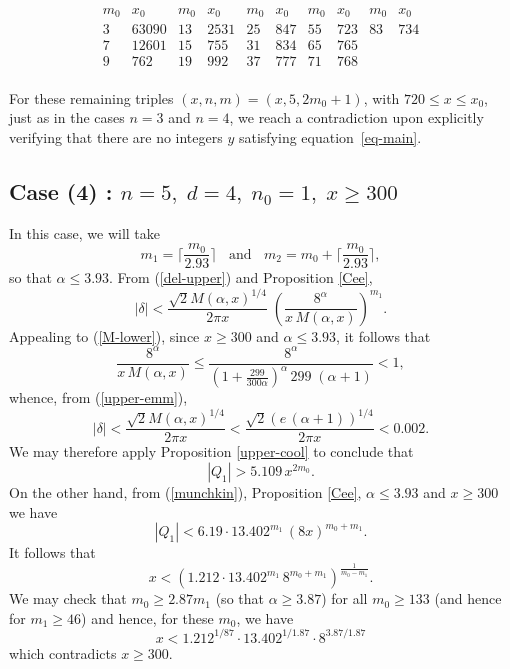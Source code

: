 {$$
\begin{array}{cc|cc|cc|cc|cc} 
m_0 & x_0 & m_0 & x_0 & m_0 & x_0 & m_0 & x_0 & m_0 & x_0\\ \hline
3 & 63090 & 13 & 2531 & 25 & 847 & 55 & 723 & 83 & 734\\
7 & 12601 & 15 & 755 & 31 & 834 & 65 & 765\\
9 & 762 & 19 & 992 & 37 & 777 & 71 & 768\\

\end{array}
$$

 
For these remaining triples $(x,n,m)=(x,5,2m_0+1)$, with $720 \leq x \leq x_0$, just as in the cases $n=3$ and $n=4$, we reach a contradiction  upon explicitly verifying that there are no integers $y$ satisfying equation~\eqref{eq-main}. 

\subsection{Case (4) : $n=5, \; d=4, \;  n_0=1, \; x \geq 300$}

In this case, we will take
$$
m_1 = \Big\lceil \frac{m_0}{2.93} \Big\rceil \; \; \mbox{ and } \; \; m_2 = m_0+  \Big\lceil \frac{m_0}{2.93} \Big\rceil,
$$
so that $\alpha \leq 3.93$. 
From (\ref{del-upper}) and   Proposition \ref{Cee}, 
$$
|\delta| < \frac{\sqrt{2}M(\alpha,x)^{1/4}}{2\pi x} \; \left( \frac{8^{\alpha} }{x \, M(\alpha,x)} \right)^{m_1}.
$$
Appealing to (\ref{M-lower}), since $x \geq 300$ and $\alpha \leq 3.93$, it follows that 
$$
\frac{8^{\alpha} }{x \, M(\alpha,x)} \leq \frac{8^{\alpha} }{\left( 1 + \frac{299}{300 \alpha} \right)^\alpha \, 299 \; (\alpha+1)} < 1,
$$
whence, from (\ref{upper-emm}), 
$$
|\delta| < \frac{\sqrt{2}M(\alpha,x)^{1/4}}{2\pi x} < \frac{\sqrt{2}(e \, (\alpha+1))^{1/4}}{2\pi x}  < 0.002.
$$
We may therefore apply Proposition \ref{upper-cool} to conclude that
\begin{equation} \label{cliff2}
 |Q_1| > 5.109 \, x^{2m_0}.
\end{equation}
On the other hand, from (\ref{munchkin}), Proposition \ref{Cee}, $\alpha \leq 3.93$ and $x \geq 300$ we have
$$
|Q_1| < 6.19 \cdot 13.402^{m_1}  \, (8x)^{m_0+m_1}.
$$
 It follows that
\[
x < \left(1.212 \cdot 13.402^{m_1}  \, 8^{m_0+m_1} \right)^{\frac{1}{m_0-m_1}}.
\]
 We may check that $m_0 \geq 2.87 m_1$ (so that $\alpha\geq 3.87$) for all $m_0 \geq 133$ (and hence for $m_1\geq 46$) and hence, for these $m_0$, we have 
 $$
 x < 1.212^{1/87} \cdot 13.402^{1/1.87} \cdot 8^{3.87/1.87}
 $$
 which contradicts  $x\geq 300$. 
 
}
